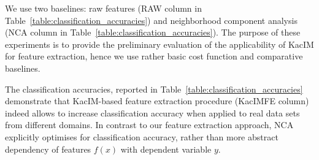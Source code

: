 \documentclass{article}
\begin{document}
We use two baselines: raw features (RAW column in Table~\ref{table:classification_accuracies}) and neighborhood component analysis~\cite{NIPS2004_42fe8808} (NCA column in Table~\ref{table:classification_accuracies}).  The purpose of these experiments is to provide the preliminary evaluation of the applicability of KacIM for feature extraction, hence we use rather basic cost function and comparative baselines.




The classification accuracies, reported in Table~\ref{table:classification_accuracies} demonstrate that KacIM-based feature extraction procedure (KacIMFE column) indeed allows to increase classification accuracy when applied to real data sets from different domains. In contrast to our feature extraction approach, NCA explicitly optimises for classification accuracy, rather than more abstract dependency of features $f(x)$ with dependent variable $y$.
\end{document}

